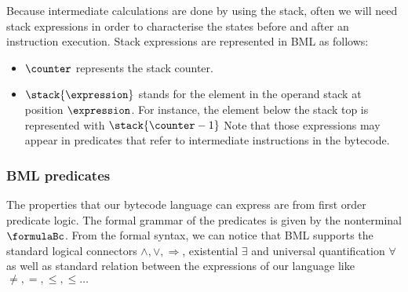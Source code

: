 Because intermediate calculations are done by using the stack, often we will need stack expressions in order to characterise the states before and after an instruction
execution. Stack expressions are represented in BML as follows:
\begin{itemize}
      \item  $\counter$ represents the stack counter.
      \item  $\stack{ \expression}$ stands for the element in the operand stack at position $\expression$.   
             For instance, the element below the stack top is represented with $\stack{\counter - 1}$ 
             Note that those expressions may appear in predicates that refer to intermediate instructions in the bytecode. 
           
 \end{itemize}


%
% 
%

\subsubsection{BML predicates}
 The properties that our bytecode language can express are from first order predicate logic. The formal grammar of the predicates is
 given by the nonterminal $\formulaBc$. From the formal syntax, we can notice that BML supports the standard logical connectors
 $\wedge, \vee, \Rightarrow $, existential $\exists$ and universal quantification $\forall$ as well as standard relation between
 the  expressions of our language like $\neq, = , \leq, \le \ldots$  
 


